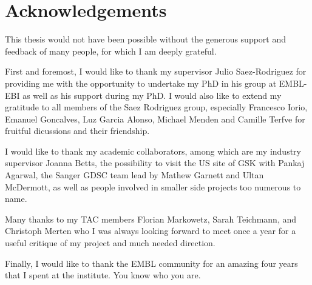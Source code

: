 \chapter*{Acknowledgements}

This thesis would not have been possible without the generous support and
feedback of many people, for which I am deeply grateful.

First and foremost, I would like to thank my supervisor Julio Saez-Rodriguez
for providing me with the opportunity to undertake my PhD in his group at
EMBL-EBI as well as his support during my PhD. I would also like to extend my
gratitude to all members of the Saez Rodriguez group, especially Francesco
Iorio, Emanuel Goncalves, Luz Garcia Alonso, Michael Menden and Camille Terfve
for fruitful dicussions and their friendship.

I would like to thank my academic collaborators, among which are my industry
supervisor Joanna Betts, the possibility to visit the US site of GSK with
Pankaj Agarwal, the Sanger GDSC team lead by Mathew Garnett and Ultan
McDermott, as well as people involved in smaller side projects too numerous to
name.

Many thanks to my TAC members Florian Markowetz, Sarah Teichmann, and Christoph
Merten who I was always looking forward to meet once a year for a useful
critique of my project and much needed direction.

Finally, I would like to thank the EMBL community for an amazing four years
that I spent at the institute. You know who you are.
